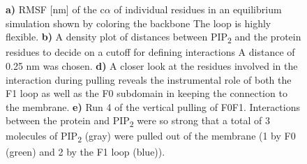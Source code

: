 \documentclass[
  twocolumn]{biophys-new-mod}
\begin{document}
\begin{figure}
\begin{minipage}[t]{0.50\linewidth}
{{}

}

\subcaption{\label{fig-f0f1-vert-pull-residues}~}
\end{minipage}%
\newline
\begin{minipage}[t]{\linewidth}

{\centering 


}

\subcaption{\label{fig-f0f1-vert-pull-run4}~}
\end{minipage}%

\caption{\label{fig-suppl}\textbf{a)} RMSF {[}nm{]} of the c\(\alpha\)
of individual residues in an equilibrium simulation shown by coloring
the backbone The loop is highly flexible. \textbf{b)} A density plot of
distances between PIP\textsubscript{2} and the protein residues to
decide on a cutoff for defining interactions A distance of 0.25 nm was
chosen. \textbf{d)} A closer look at the residues involved in the
interaction during pulling reveals the instrumental role of both the F1
loop as well as the F0 subdomain in keeping the connection to the
membrane. \textbf{e)} Run 4 of the vertical pulling of F0F1.
Interactions between the protein and PIP\textsubscript{2} were so strong
that a total of 3 molecules of PIP\textsubscript{2} (gray) were pulled
out of the membrane (1 by F0 (green) and 2 by the F1 loop (blue)).}

\end{figure}
\end{document}
